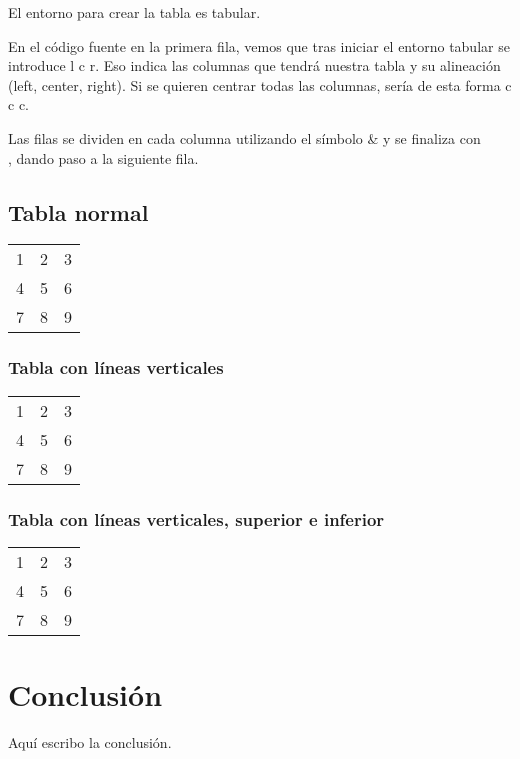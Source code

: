 \documentclass[12pt]{book} %
\begin{document}
El entorno para crear la tabla es tabular.

En el c\'odigo fuente en la primera fila, vemos que tras iniciar el entorno tabular se introduce {l c r}. 
Eso indica las columnas que tendrá
nuestra tabla y su alineación (left, center, right). Si se quieren centrar todas las columnas, sería de esta forma {c c c}.

Las filas se dividen en cada columna utilizando el s\'imbolo \& y se finaliza con \\, dando paso a la siguiente fila.

\section{Tabla normal}

\begin{tabular}{ l c r }
   1 & 2 & 3 \\
   4 & 5 & 6 \\
   7 & 8 & 9 \\
 \end{tabular}


\subsection{Tabla con l\'ineas verticales}

\begin{tabular}{| l | c | r | }
   1 & 2 & 3 \\
   4 & 5 & 6 \\
   7 & 8 & 9 \\
 \end{tabular}

\subsection{Tabla con l\'ineas verticales, superior e inferior}
\begin{tabular}{ | l | c | r | }
 \hline                 
   1 & 2 & 3 \\
   4 & 5 & 6 \\
   7 & 8 & 9 \\
 \hline  
 \end{tabular}



\backmatter
\chapter{Conclusi\'on}
 
Aqu\'i escribo la conclusi\'on.
 
\end{document}
